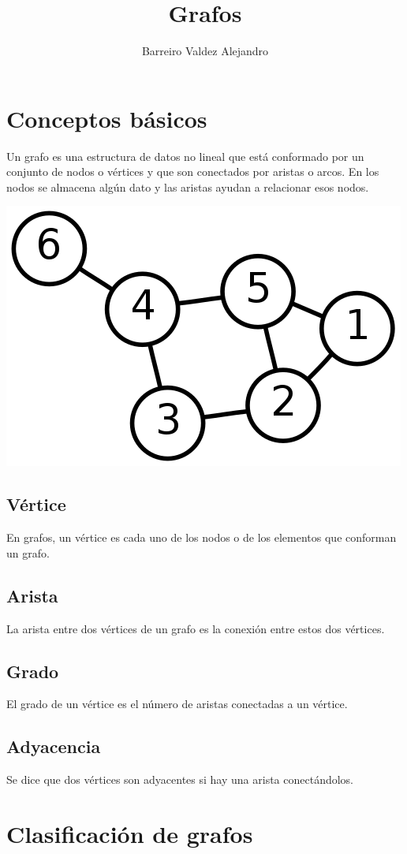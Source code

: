 \documentclass[twocolumn]{article}
\title{Grafos}
\author{Barreiro Valdez Alejandro}
\begin{document}
\maketitle


\section{Conceptos básicos}
Un grafo es una estructura de datos no lineal que está conformado por un conjunto de nodos o vértices y que son conectados por aristas o arcos. En los nodos se almacena algún dato y las aristas ayudan a relacionar esos nodos.

\includegraphics[width = .45\textwidth]{imagenes/grafo.png}

\subsection{Vértice}
En grafos, un vértice es cada uno de los nodos o de los elementos que conforman un grafo.
\subsection{Arista}
La arista entre dos vértices de un grafo es la conexión entre estos dos vértices.
\subsection{Grado}
El grado de un vértice es el número de aristas conectadas a un vértice.
\subsection{Adyacencia}
Se dice que dos vértices son adyacentes si hay una arista conectándolos.

\section{Clasificación de grafos}
\end{document}
